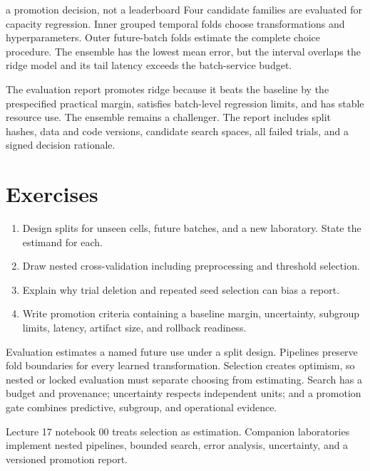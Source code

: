 \begin{workedexample}{a promotion decision, not a leaderboard}
Four candidate families are evaluated for capacity regression. Inner grouped
temporal folds choose transformations and hyperparameters. Outer future-batch
folds estimate the complete choice procedure. The ensemble has the lowest mean
error, but the interval overlaps the ridge model and its tail latency exceeds
the batch-service budget.

The evaluation report promotes ridge because it beats the baseline by the
prespecified practical margin, satisfies batch-level regression limits, and has
stable resource use. The ensemble remains a challenger. The report includes
split hashes, data and code versions, candidate search spaces, all failed trials,
and a signed decision rationale.
\end{workedexample}

\section{Exercises}
\begin{enumerate}
  \item Design splits for unseen cells, future batches, and a new laboratory.
  State the estimand for each.
  \item Draw nested cross-validation including preprocessing and threshold
  selection.
  \item Explain why trial deletion and repeated seed selection can bias a report.
  \item Write promotion criteria containing a baseline margin, uncertainty,
  subgroup limits, latency, artifact size, and rollback readiness.
\end{enumerate}

\begin{chapterreview}
Evaluation estimates a named future use under a split design. Pipelines preserve
fold boundaries for every learned transformation. Selection creates optimism,
so nested or locked evaluation must separate choosing from estimating. Search
has a budget and provenance; uncertainty respects independent units; and a
promotion gate combines predictive, subgroup, and operational evidence.
\end{chapterreview}

\begin{notebooklink}
Lecture 17 notebook 00 treats selection as estimation. Companion laboratories
implement nested pipelines, bounded search, error analysis, uncertainty, and a
versioned promotion report.
\end{notebooklink}
